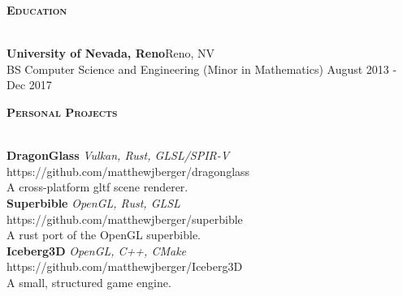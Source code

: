 \documentclass[a4paper]{article}
\newcommand{\lineunder} {
    \vspace*{-8pt} \\
    \hspace*{-18pt} \hrulefill \\
}
\newcommand{\header} [1] {
    {\hspace*{-18pt}\vspace*{6pt} \large \textbf{\textsc{#1}}}
    \vspace*{-6pt} \lineunder
    \vspace*{4pt}
}
\begin{document}
\header{Education}
\textbf{University of Nevada, Reno}\hfill Reno, NV\\
BS Computer Science and Engineering (Minor in Mathematics) \hfill August 2013 - Dec 2017\\
\vspace{2mm}

\header{Personal Projects}
{\textbf{DragonGlass}} {\sl Vulkan, Rust, GLSL/SPIR-V} \hfill https://github.com/matthewjberger/dragonglass\\
A cross-platform gltf scene renderer.\\
\vspace*{2mm}
{\textbf{Superbible}} {\sl OpenGL, Rust, GLSL} \hfill https://github.com/matthewjberger/superbible\\
A rust port of the OpenGL superbible.\\
\vspace*{2mm}
{\textbf{Iceberg3D}} {\sl OpenGL, C++, CMake} \hfill https://github.com/matthewjberger/Iceberg3D\\
A small, structured game engine.\\
\vspace*{2mm}
\end{document}
